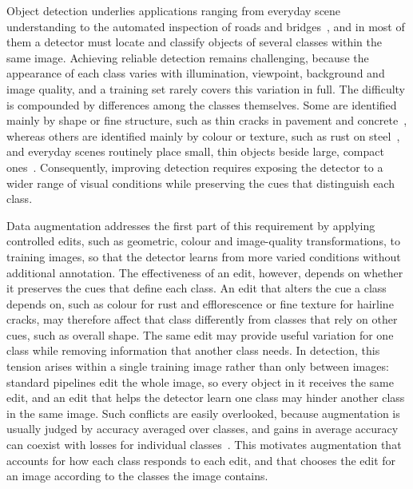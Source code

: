 \documentclass[conference]{IEEEtran}
\begin{document}
Object detection underlies applications ranging from everyday scene understanding to the automated inspection of roads and bridges~\cite{everingham2010voc,shang2024automated,zheng2024deep,vision2025inspection}, and in most of them a detector must locate and classify objects of several classes within the same image. Achieving reliable detection remains challenging, because the appearance of each class varies with illumination, viewpoint, background and image quality, and a training set rarely covers this variation in full. The difficulty is compounded by differences among the classes themselves. Some are identified mainly by shape or fine structure, such as thin cracks in pavement and concrete~\cite{arya2024rdd,flotzinger2024dacl10k}, whereas others are identified mainly by colour or texture, such as rust on steel~\cite{flotzinger2024dacl10k}, and everyday scenes routinely place small, thin objects beside large, compact ones~\cite{everingham2010voc}. Consequently, improving detection requires exposing the detector to a wider range of visual conditions while preserving the cues that distinguish each class.

Data augmentation addresses the first part of this requirement by applying controlled edits, such as geometric, colour and image-quality transformations, to training images, so that the detector learns from more varied conditions without additional annotation. The effectiveness of an edit, however, depends on whether it preserves the cues that define each class. An edit that alters the cue a class depends on, such as colour for rust and efflorescence or fine texture for hairline cracks, may therefore affect that class differently from classes that rely on other cues, such as overall shape. The same edit may provide useful variation for one class while removing information that another class needs. In detection, this tension arises within a single training image rather than only between images: standard pipelines edit the whole image, so every object in it receives the same edit, and an edit that helps the detector learn one class may hinder another class in the same image. Such conflicts are easily overlooked, because augmentation is usually judged by accuracy averaged over classes, and gains in average accuracy can coexist with losses for individual classes~\cite{kirichenko2023}. This motivates augmentation that accounts for how each class responds to each edit, and that chooses the edit for an image according to the classes the image contains.
\end{document}

